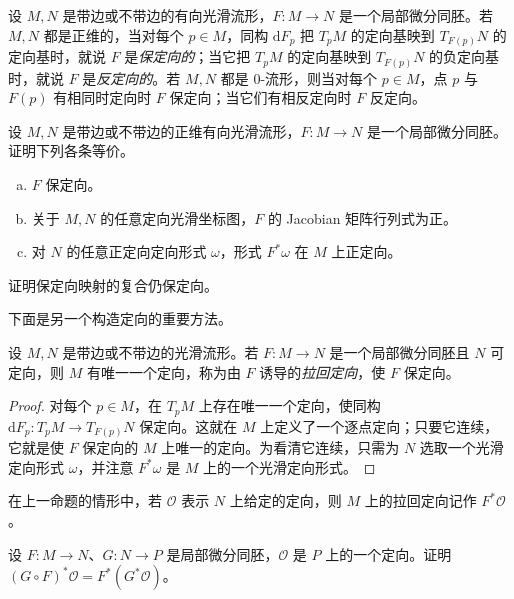 \documentclass[../../main.tex]{subfiles}
\begin{document}
设 $M,N$ 是带边或不带边的有向光滑流形，$F:M\to N$ 是一个局部微分同胚。若 $M,N$ 都是正维的，当对每个 $p\in M$，同构 $\mathrm{d}F_p$ 把 $T_pM$ 的定向基映到 $T_{F(p)}N$ 的定向基时，就说 $F$ 是\emph{保定向的}；当它把 $T_pM$ 的定向基映到 $T_{F(p)}N$ 的负定向基时，就说 $F$ 是\emph{反定向的}。若 $M,N$ 都是 $0$-流形，则当对每个 $p\in M$，点 $p$ 与 $F(p)$ 有相同时定向时 $F$ 保定向；当它们有相反定向时 $F$ 反定向。

\begin{exercise}\label{exercise:ch15-13}
设 $M,N$ 是带边或不带边的正维有向光滑流形，$F:M\to N$ 是一个局部微分同胚。证明下列各条等价。
\begin{enumerate}[(a)]
\item $F$ 保定向。
\item 关于 $M,N$ 的任意定向光滑坐标图，$F$ 的 Jacobian 矩阵行列式为正。
\item 对 $N$ 的任意正定向定向形式 $\omega$，形式 $F^*\omega$ 在 $M$ 上正定向。
\end{enumerate}
\end{exercise}

\begin{exercise}\label{exercise:ch15-14}
证明保定向映射的复合仍保定向。
\end{exercise}

下面是另一个构造定向的重要方法。

\begin{proposition}[拉回定向]\label{proposition:ch15-pullback-orientation}
设 $M,N$ 是带边或不带边的光滑流形。若 $F:M\to N$ 是一个局部微分同胚且 $N$ 可定向，则 $M$ 有唯一一个定向，称为由 $F$ 诱导的\emph{拉回定向}，使 $F$ 保定向。
\end{proposition}

\begin{proof}
对每个 $p\in M$，在 $T_pM$ 上存在唯一一个定向，使同构 $\mathrm{d}F_p:T_pM\to T_{F(p)}N$ 保定向。这就在 $M$ 上定义了一个逐点定向；只要它连续，它就是使 $F$ 保定向的 $M$ 上唯一的定向。为看清它连续，只需为 $N$ 选取一个光滑定向形式 $\omega$，并注意 $F^*\omega$ 是 $M$ 上的一个光滑定向形式。
\end{proof}

在上一命题的情形中，若 $\mathcal O$ 表示 $N$ 上给定的定向，则 $M$ 上的拉回定向记作 $F^*\mathcal O$。

\begin{exercise}\label{exercise:ch15-16}
设 $F:M\to N$、$G:N\to P$ 是局部微分同胚，$\mathcal O$ 是 $P$ 上的一个定向。证明 $(G\circ F)^*\mathcal O=F^*(G^*\mathcal O)$。
\end{exercise}
\end{document}

